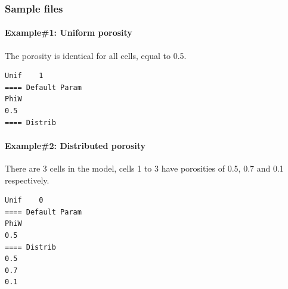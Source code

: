 \subsubsection{Sample files}
%
\paragraph*{Example\#1: Uniform porosity}
The porosity is identical for all cells, equal to 0.5.
\begin{verbatim}
Unif	1
==== Default Param
PhiW
0.5
==== Distrib
\end{verbatim}
%
\paragraph*{Example\#2: Distributed porosity}
There are 3 cells in the model, cells 1 to 3 have porosities of 0.5, 0.7 and 0.1 respectively.
\begin{verbatim}
Unif	0
==== Default Param
PhiW
0.5
==== Distrib
0.5
0.7
0.1
\end{verbatim}